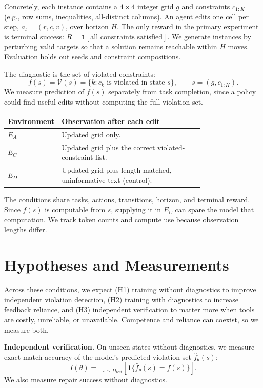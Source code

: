 \documentclass[11pt]{article}
\newcommand{\V}{\mathcal{V}}
\newcommand{\E}{\mathbb{E}}
\begin{document}
Concretely, each instance contains a $4\times4$ integer grid $g$ and constraints $c_{1:K}$ (e.g., row sums, inequalities, all-distinct columns). An agent edits one cell per step, $a_t=(r,c,v)$, over horizon $H$. The only reward in the primary experiment is terminal success: $R=\mathbf{1}[\text{all constraints satisfied}]$. We generate instances by perturbing valid targets so that a solution remains reachable within $H$ moves. Evaluation holds out seeds and constraint compositions.

The diagnostic is the set of violated constraints:
\begin{equation}
  f(s)=\V(s)=\{k:c_k\text{ is violated in state }s\},\qquad s=(g,c_{1:K}). \label{eq:verification}
\end{equation}
We measure prediction of $f(s)$ separately from task completion, since a policy could find useful edits without computing the full violation set.

\begin{center}
  \begin{tabular}{@{}lp{0.76\linewidth}@{}}
    \toprule
    \textbf{Environment} & \textbf{Observation after each edit} \\
    \midrule
    $E_A$ & Updated grid only.\\
    $E_C$ & Updated grid plus the correct violated-constraint list.\\
    $E_D$ & Updated grid plus length-matched, uninformative text (control).\\
    \bottomrule
  \end{tabular}
\end{center}
The conditions share tasks, actions, transitions, horizon, and terminal reward. Since $f(s)$ is computable from $s$, supplying it in $E_C$ can spare the model that computation. We track token counts and compute use because observation lengths differ.

\section{Hypotheses and Measurements}
Across these conditions, we expect (H1) training without diagnostics to improve independent violation detection, (H2) training with diagnostics to increase feedback reliance, and (H3) independent verification to matter more when tools are costly, unreliable, or unavailable. Competence and reliance can coexist, so we measure both.

\textbf{Independent verification.} On unseen states without diagnostics, we measure exact-match accuracy of the model's predicted violation set $\hat f_\theta(s)$:
\begin{equation}
  I(\theta)=\E_{s\sim D_{\mathrm{test}}}\left[\mathbf 1\{\hat f_\theta(s)=f(s)\}\right]. \label{eq:internalization}
\end{equation}
We also measure repair success without diagnostics.
\end{document}
